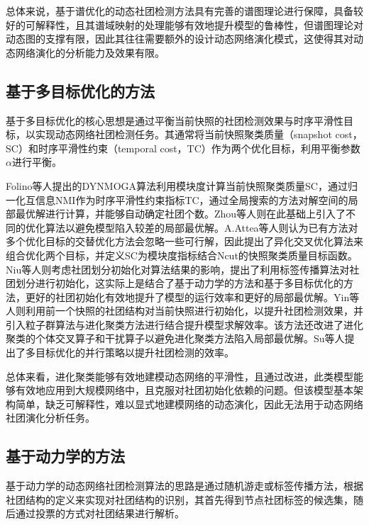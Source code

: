 总体来说，基于谱优化的动态社团检测方法具有完善的谱图理论进行保障，具备较好的可解释性，且其谱域映射的处理能够有效地提升模型的鲁棒性，但谱图理论对动态图的支撑有限，因此其往往需要额外的设计动态网络演化模式，这使得其对动态网络演化的分析能力及效果有限。

\subsection{基于多目标优化的方法}

基于多目标优化的核心思想是通过平衡当前快照的社团检测效果与时序平滑性目标，以实现动态网络社团检测任务。其通常将当前快照聚类质量（snapshot cost，SC）和时序平滑性约束（temporal cost，TC）作为两个优化目标，利用平衡参数$\alpha$进行平衡。

Folino等人\cite{folino2013evolutionary}提出的DYNMOGA算法利用模块度计算当前快照聚类质量SC，通过归一化互信息NMI作为时序平滑性约束指标TC，通过全局搜索的方法对解空间的局部最优解进行计算，并能够自动确定社团个数。Zhou等人\cite{zhou2015multiobjective,zhou2017multiobjective}则在此基础上引入了不同的优化算法以避免模型陷入较差的局部最优解。A.Attea等人\cite{bara2016new}则认为已有方法对多个优化目标的交替优化方法会忽略一些可行解，因此提出了异化交叉优化算法来组合优化两个目标，并定义SC为模块度指标结合Ncut的快照聚类质量目标函数。Niu等人\cite{niu2017label}则考虑社团划分初始化对算法结果的影响，提出了利用标签传播算法对社团划分进行初始化，这实际上是结合了基于动力学的方法和基于多目标优化的方法，更好的社团初始化有效地提升了模型的运行效率和更好的局部最优解。Yin等人\cite{yin2021multi}则利用前一个快照的社团结构对当前快照进行初始化，以提升社团检测效果，并引入粒子群算法与进化聚类方法进行结合提升模型求解效率。该方法还改进了进化聚类的个体交叉算子和干扰算子以避免进化聚类方法陷入局部最优解。Su等人\cite{su2021parallel}提出了多目标优化的并行策略以提升社团检测的效率。

总体来看，进化聚类能够有效地建模动态网络的平滑性，且通过改进，此类模型能够有效地应用到大规模网络中，且克服对社团初始化依赖的问题。但该模型基本架构简单，缺乏可解释性，难以显式地建模网络的动态演化，因此无法用于动态网络社团演化分析任务。

\subsection{基于动力学的方法}

基于动力学的动态网络社团检测算法的思路是通过随机游走或标签传播方法，根据社团结构的定义来实现对社团结构的识别，其首先得到节点社团标签的候选集，随后通过投票的方式对社团结果进行解析。

